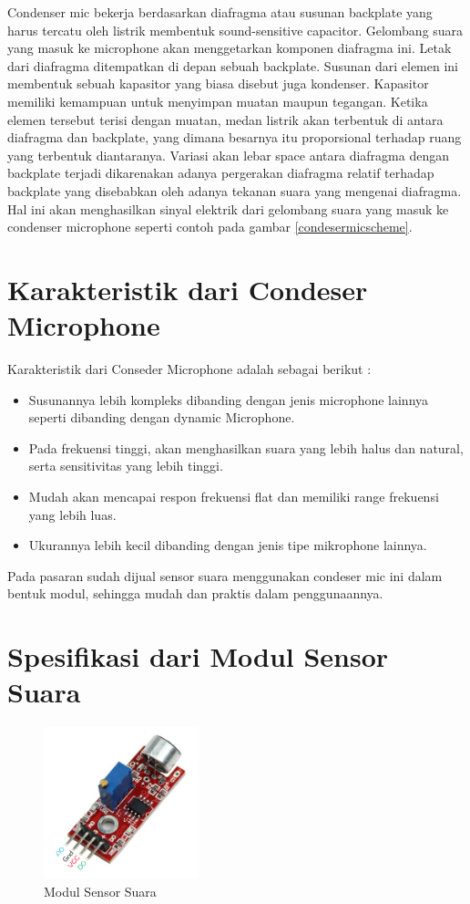 Condenser mic bekerja berdasarkan diafragma atau susunan backplate yang harus tercatu oleh listrik membentuk sound-sensitive capacitor. Gelombang suara yang masuk ke microphone akan menggetarkan komponen diafragma ini. Letak dari diafragma ditempatkan di depan sebuah backplate. Susunan dari elemen ini membentuk sebuah kapasitor yang biasa disebut juga kondenser. Kapasitor memiliki kemampuan untuk menyimpan muatan maupun tegangan. Ketika elemen tersebut terisi dengan muatan, medan listrik akan terbentuk di antara diafragma dan backplate, yang dimana besarnya itu proporsional terhadap ruang yang terbentuk diantaranya. Variasi akan lebar space antara diafragma dengan backplate terjadi dikarenakan adanya pergerakan diafragma relatif terhadap backplate yang disebabkan oleh adanya tekanan suara yang mengenai diafragma. Hal ini akan menghasilkan sinyal elektrik dari gelombang suara yang masuk ke condenser microphone seperti contoh pada gambar \ref{condesermicscheme}.

\section{Karakteristik dari Condeser Microphone}

\hspace{4mm} Karakteristik dari Conseder Microphone adalah sebagai berikut :

\begin{itemize}
\item Susunannya lebih kompleks dibanding dengan jenis microphone lainnya seperti dibanding dengan dynamic Microphone.
\item Pada frekuensi tinggi, akan menghasilkan suara yang lebih halus dan natural, serta sensitivitas yang lebih tinggi.
\item Mudah akan mencapai respon frekuensi flat dan memiliki range frekuensi yang lebih luas.
\item Ukurannya lebih kecil dibanding dengan jenis tipe mikrophone lainnya.
\end{itemize}

Pada pasaran sudah dijual sensor suara menggunakan condeser mic ini dalam bentuk modul, sehingga mudah dan praktis dalam penggunaannya.

\section{Spesifikasi dari Modul Sensor Suara}

\begin{figure}[ht]
\centerline{\includegraphics[width=0.4\textwidth]{figures/sssensorsuara.png}}
\caption{Modul Sensor Suara}
\label{sssensorsuara}
\end{figure}

